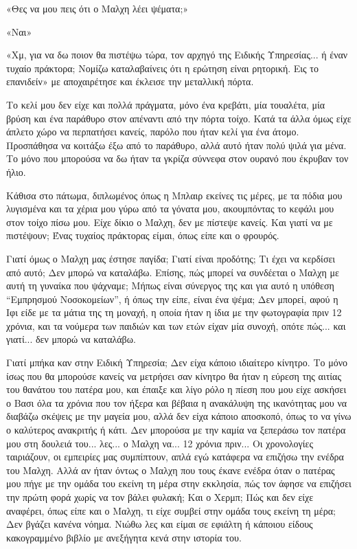 \documentclass[12pt,twoside, openany]{book}
\begin{document}
«Θες να μου πεις ότι ο Μαλχη λέει ψέματα;»

«Ναι»

«Χμ, για να δω ποιον θα πιστέψω τώρα, τον αρχηγό της Ειδικής Υπηρεσίας... ή έναν τυχαίο πράκτορα; Νομίζω καταλαβαίνεις ότι η ερώτηση είναι ρητορική. Εις το επανιδείν» με αποχαιρέτησε και έκλεισε την μεταλλική πόρτα.

Το κελί μου δεν είχε και πολλά πράγματα, μόνο ένα κρεβάτι, μία τουαλέτα, μία βρύση και ένα παράθυρο στον απέναντι από την πόρτα τοίχο. Κατά τα άλλα όμως είχε άπλετο χώρο να περπατήσει κανείς, παρόλο που ήταν κελί για ένα άτομο. Προσπάθησα να κοιτάξω έξω από το παράθυρο, αλλά αυτό ήταν πολύ ψιλά για μένα. Το μόνο που μπορούσα να δω ήταν τα γκρίζα σύννεφα στον ουρανό που έκρυβαν τον ήλιο.

Κάθισα στο πάτωμα, διπλωμένος όπως η Μπλαιρ εκείνες τις μέρες, με τα πόδια μου λυγισμένα και τα χέρια μου γύρω από τα γόνατα μου, ακουμπόντας το κεφάλι μου στον τοίχο πίσω μου. Είχε δίκιο ο Μαλχη, δεν με πίστεψε κανείς. Και γιατί να με πιστέψουν; Ένας τυχαίος πράκτορας είμαι, όπως είπε και ο φρουρός.

Γιατί όμως ο Μαλχη μας έστησε παγίδα; Γιατί είναι προδότης; Τι έχει να κερδίσει από αυτό; Δεν μπορώ να καταλάβω. Επίσης, πώς μπορεί να συνδέεται ο Μαλχη με αυτή τη γυναίκα που ψάχναμε; Μήπως είναι σύνεργος της και για αυτό η υπόθεση “Εμπρησμού Νοσοκομείων”, ή όπως την είπε, είναι ένα ψέμα; Δεν μπορεί, αφού η Ιφι είδε με τα μάτια της τη μοναχή, η οποία ήταν η ίδια με την φωτογραφία πριν 12 χρόνια, και τα νούμερα των παιδιών και των ετών είχαν μία συνοχή, οπότε πώς... και γιατί... δεν μπορώ να καταλάβω.

Γιατί μπήκα καν στην Ειδική Υπηρεσία; Δεν είχα κάποιο ιδιαίτερο κίνητρο. Το μόνο ίσως που θα μπορούσε κανείς να μετρήσει σαν κίνητρο θα ήταν η εύρεση της αιτίας του θανάτου του πατέρα μου, και έπαιξε και λίγο ρόλο η πίεση που μου είχε ασκήσει ο Βασι όλα τα χρόνια που τον ήξερα και βέβαια η ανακάλυψη της ικανότητας μου να διαβάζω σκέψεις με την μαγεία μου, αλλά δεν είχα κάποιο αποσκοπό, όπως το να γίνω ο καλύτερος ανακριτής ή κάτι. Δεν μπορούσα με την καμία να ξεπεράσω τον πατέρα μου στη δουλειά του... λες... ο Μαλχη να... 12 χρόνια πριν... Οι χρονολογίες ταιριάζουν, οι εμπειρίες μας συμπίπτουν, απλά εγώ κατάφερα να επιζήσω την ενέδρα του Μαλχη. Αλλά αν ήταν όντως ο Μαλχη που τους έκανε ενέδρα όταν ο πατέρας μου πήγε με την ομάδα του εκείνη τη μέρα στην εκκλησία, πώς τον άφησε να επιζήσει την πρώτη φορά χωρίς να τον βάλει φυλακή; Και ο Χερμπ; Πώς και δεν είχε αναφέρει, όπως είπε και ο Μαλχη, τι είχε συμβεί στην ομάδα τους εκείνη τη μέρα; Δεν βγάζει κανένα νόημα. Νιώθω λες και είμαι σε εφιάλτη ή κάποιου είδους κακογραμμένο βιβλίο με ανεξήγητα κενά στην ιστορία του.
\end{document}
